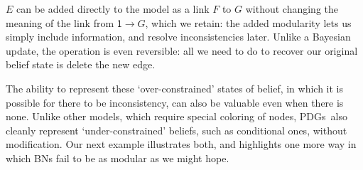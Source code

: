 \documentclass{article}
\newcommand\changed[1]{{\color{note-fg} #1}}
\newcommand{\MN}{PDG}
\newcommand{\MNs}{\MN s}
\begin{document}
\begin{example}
		
		\changed{$E$ can be added directly to the model as a link $F$ to $G$ without changing the meaning of the link from $\mathsf 1 \to G$, which we retain: the added modularity lets us simply include information, and resolve inconsistencies later. Unlike a Bayesian update, the operation is even reversible:} all we need to do to recover our original belief state is delete the new edge.
	\end{example}			
	
%	
%		
%		
	
	The ability to represent these `over-constrained' states of belief, in which it is possible for there to be inconsistency, can also be valuable even when there is none. 
	\changed{Unlike other models, which require special coloring of nodes, \MNs\ also cleanly represent `under-constrained' beliefs, such as conditional ones, without modification.}
	Our next example illustrates both, and highlights one more way in which BNs fail to be as modular as we might hope.
	
\end{document}
